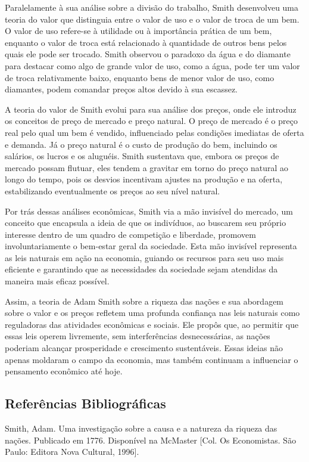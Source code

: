 \documentclass[a4paper,12pt]{article}[abntex2]
\begin{document}
Paralelamente à sua análise sobre a divisão do trabalho, Smith desenvolveu uma teoria do valor que distinguia entre o valor de uso e o valor de troca de um bem. O valor de uso refere-se à utilidade ou à importância prática de um bem, enquanto o valor de troca está relacionado à quantidade de outros bens pelos quais ele pode ser trocado. Smith observou o paradoxo da água e do diamante para destacar como algo de grande valor de uso, como a água, pode ter um valor de troca relativamente baixo, enquanto bens de menor valor de uso, como diamantes, podem comandar preços altos devido à sua escassez.

A teoria do valor de Smith evolui para sua análise dos preços, onde ele introduz os conceitos de preço de mercado e preço natural. O preço de mercado é o preço real pelo qual um bem é vendido, influenciado pelas condições imediatas de oferta e demanda. Já o preço natural é o custo de produção do bem, incluindo os salários, os lucros e os aluguéis. Smith sustentava que, embora os preços de mercado possam flutuar, eles tendem a gravitar em torno do preço natural ao longo do tempo, pois os desvios incentivam ajustes na produção e na oferta, estabilizando eventualmente os preços ao seu nível natural.

Por trás dessas análises econômicas, Smith via a mão invisível do mercado, um conceito que encapsula a ideia de que os indivíduos, ao buscarem seu próprio interesse dentro de um quadro de competição e liberdade, promovem involuntariamente o bem-estar geral da sociedade. Esta mão invisível representa as leis naturais em ação na economia, guiando os recursos para seu uso mais eficiente e garantindo que as necessidades da sociedade sejam atendidas da maneira mais eficaz possível.

Assim, a teoria de Adam Smith sobre a riqueza das nações e sua abordagem sobre o valor e os preços refletem uma profunda confiança nas leis naturais como reguladoras das atividades econômicas e sociais. Ele propôs que, ao permitir que essas leis operem livremente, sem interferências desnecessárias, as nações poderiam alcançar prosperidade e crescimento sustentáveis. Essas ideias não apenas moldaram o campo da economia, mas também continuam a influenciar o pensamento econômico até hoje.

\subsection{\textbf{Referências Bibliográficas}}
Smith, Adam. Uma investigação sobre a causa e a natureza da riqueza das nações. Publicado
em 1776. Disponível na McMaster [Col. Os Economistas. São Paulo: Editora Nova
Cultural, 1996].
\end{document}

